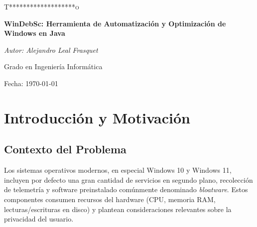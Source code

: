 \documentclass[12pt,a4paper]{report}
\begin{document}
\begin{titlepage}
    \centering
    \vspace{1cm}
    {\scshape\Large T*******************o\par}
    \vspace{1.5cm}
    {\huge\bfseries WinDebSc: Herramienta de Automatización y Optimización de Windows en Java \par}
    \vspace{2cm}
    {\Large\itshape Autor: Alejandro Leal Frasquet\par}
    \vspace{0.5cm}
    {\large Grado en Ingeniería Informática\par}
    \vfill
    {\large Fecha: \today \par}
\end{titlepage}


\begin{abstract}
Este documento describe el desarrollo de \textbf{WinDebSc}, una aplicación de escritorio desarrollada en Java diseñada para centralizar, automatizar y gestionar el proceso de optimización y eliminación de bloatware (debloating) en sistemas operativos Windows. Inspirada en utilidades como la herramienta de Chris Titus, esta solución integra ejecución segura de scripts de PowerShell, personalización de directivas de sistema y una interfaz intuitiva con trazabilidad de acciones y restauración ante fallos.
\end{abstract}

\tableofcontents
\newpage



\chapter{Introducción y Motivación}
\section{Contexto del Problema}
Los sistemas operativos modernos, en especial Windows 10 y Windows 11, incluyen por defecto una gran cantidad de servicios en segundo plano, recolección de telemetría y software preinstalado comúnmente denominado \textit{bloatware}. Estos componentes consumen recursos del hardware (CPU, memoria RAM, lecturas/escrituras en disco) y plantean consideraciones relevantes sobre la privacidad del usuario.
\end{document}
